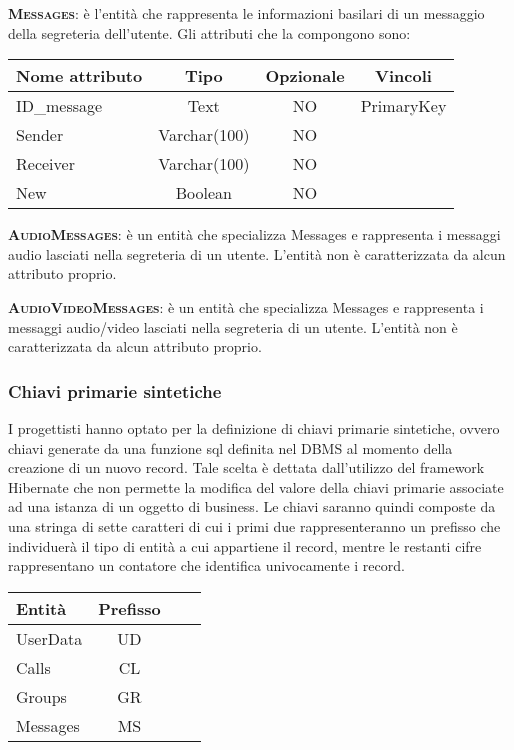 \begin{description}
	\item{\scshape\bfseries Messages}: è l'entità che rappresenta le informazioni basilari di un messaggio della segreteria dell'utente. Gli attributi che la compongono sono:

\begin{center}
\begin{tabular}{lccc}
\toprule
Nome attributo & Tipo & Opzionale & Vincoli\\
\midrule %
ID\_message & Text & NO & PrimaryKey\\
Sender & Varchar(100) & NO & \\
Receiver & Varchar(100) & NO & \\
New & Boolean & NO & \\
\bottomrule
\end{tabular}
\end{center}	
	
	\item{\scshape\bfseries AudioMessages}: è un entità che specializza Messages e rappresenta i messaggi audio lasciati nella segreteria di un utente. L'entità non è caratterizzata da alcun attributo proprio.
	
	\item{\scshape\bfseries AudioVideoMessages}: è un entità che specializza Messages e rappresenta i messaggi audio/video lasciati nella segreteria di un utente.  L'entità non è caratterizzata da alcun attributo proprio.	
	
\end{description}

\subsubsection{Chiavi primarie sintetiche}
I progettisti hanno optato per la definizione di chiavi primarie sintetiche, ovvero chiavi generate da una funzione sql definita nel DBMS al momento della creazione di un nuovo record. Tale scelta è dettata dall'utilizzo del framework Hibernate che non permette la modifica del valore della chiavi primarie associate ad una istanza di un oggetto di business. Le chiavi saranno quindi composte da una stringa di sette caratteri di cui i primi due rappresenteranno un prefisso che individuerà il tipo di entità a cui appartiene il record, mentre le restanti cifre rappresentano un contatore che identifica univocamente i record.

\begin{center}
\begin{tabular}{lccc}
\toprule
Entità & Prefisso\\
\midrule %
UserData & UD \\
Calls & CL \\
Groups & GR \\
Messages & MS\\
\bottomrule
\end{tabular}
\end{center}

